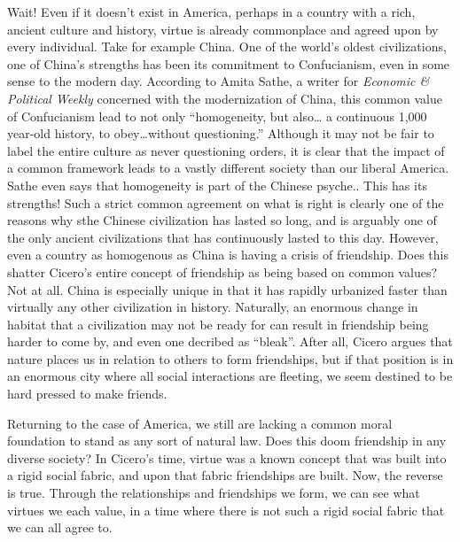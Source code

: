 \documentclass[12pt, letterpaper]{article}
\begin{document}
Wait! Even if it doesn’t exist in America, perhaps in a country with a rich, ancient culture and history, 
virtue is already commonplace and agreed upon by every individual. Take for example China. One of the world’s 
oldest civilizations, one of China’s strengths has been its commitment to Confucianism, even in some sense to 
the modern day. According to Amita Sathe, a writer for \textit{Economic \& Political Weekly} concerned with 
the modernization of China, this common value of Confucianism lead to not only ``homogeneity, but also\ldots
a continuous 1,000 year-old history, to obey\ldots without questioning.''\cite[p. 1441]{china_thing} Although it may 
not be fair to label the entire culture as never questioning orders, it is clear that the impact of 
a common framework leads to a vastly different society than our liberal America. Sathe even says that homogeneity
is part of the Chinese psyche.\cite[p. 1439]{china_thing}. This has its strengths! Such a strict common agreement on what is right is clearly one of the reasons why sthe Chinese 
civilization has lasted so long, and is arguably one of the only ancient civilizations that has continuously 
lasted to this day. However, even a country as homogenous as China is having a crisis of friendship. Does this 
shatter Cicero’s entire concept of friendship as being based on common values? Not at all. China is especially 
unique in that it has rapidly urbanized\cite[p. 1439]{china_thing} faster than virtually any other civilization in history. Naturally, an 
enormous change in habitat that a civilization may not be ready for can result in friendship being harder to 
come by, and even one decribed as ``bleak''.\cite[p. 1439]{china_thing} After all, Cicero argues that nature places us in relation to others to form friendships, but if that 
position is in an enormous city where all social interactions are fleeting, we seem destined to be hard pressed 
to make friends.

Returning to the case of America, we still are lacking a common moral foundation to stand as any sort of natural 
law. Does this doom friendship in any diverse society? In Cicero’s time, virtue was a known concept that was 
built into a rigid social fabric, and upon that fabric friendships are built. Now, the reverse is true. 
Through the relationships and friendships we form, we can see what virtues we each value, in a time where 
there is not such a rigid social fabric that we can all agree to. 
\end{document}
